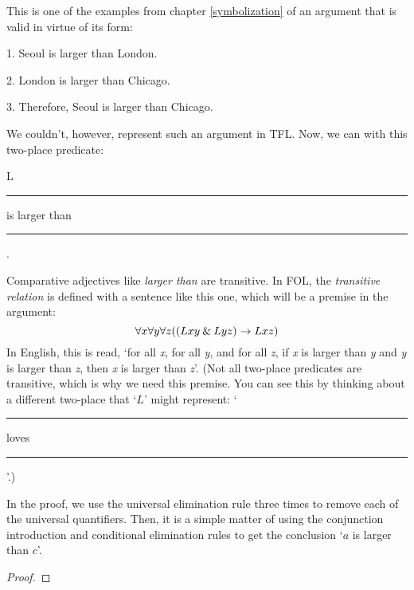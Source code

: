 \noindent\begin{minipage}{0.99\textwidth}
This is one of the examples from chapter \ref{symbolization} of an argument that is valid in virtue of its form:
	\begin{earg}
		\item[1.] Seoul is larger than London.
		\item[2.] London is larger than Chicago.
		\item[3.] Therefore, Seoul is larger than Chicago. 
	\end{earg}
\end{minipage}\bigskip

\noindent We couldn't, however, represent such an argument in TFL. Now, we can with this two-place predicate: 
\begin{ekey}
	\item[L] \rule{1cm}{0.15mm} is larger than \rule{1cm}{0.15mm} .
\end{ekey}
Comparative adjectives like \textit{larger than} are transitive. In FOL, the \textit{transitive relation} is defined with a sentence like this one, which will be a premise in the argument:
$$\forall x \forall y \forall z((Lxy \mathbin{\&} Lyz) \rightarrow Lxz)$$
In English, this is read, `for all \textit{x}, for all \textit{y}, and for all \textit{z}, if \textit{x} is larger than \textit{y} and \textit{y} is larger than \textit{z}, then \textit{x} is larger than \textit{z}'. 
(Not all two-place predicates are transitive, which is why we need this premise. You can see this by thinking about a different two-place that `$L$' might represent: `\rule{1cm}{0.15mm} loves \rule{1cm}{0.15mm}'.)
 


\smallskip
In the proof, we use the universal elimination rule three times to remove each of the universal quantifiers. Then, it is a simple matter of using the conjunction introduction and conditional elimination rules to get the conclusion `$a$ is larger than $c$'.


\begin{proof}
	 \pr{}
	 \pr{}
	 \pr{}
	 
	 
	 
	 
	 
\end{proof}


